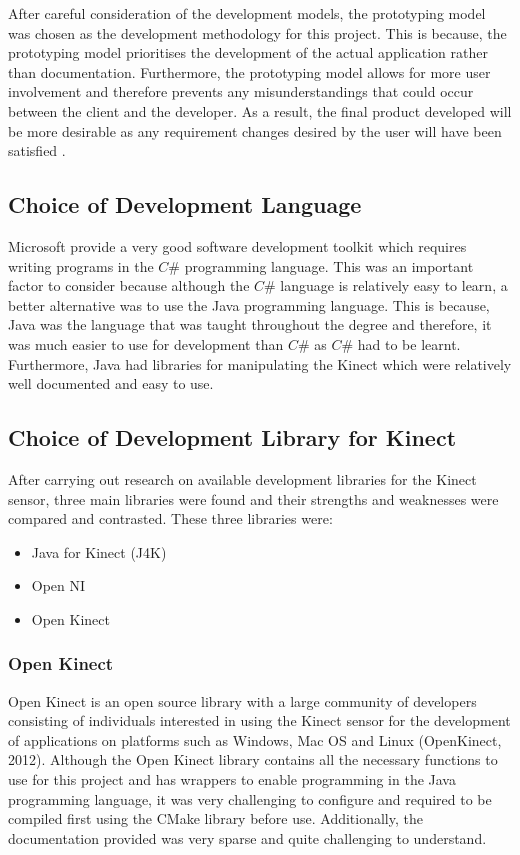 \documentclass[a4paper, 12pt]{article}
\begin{document}
\parskip 0.2in

After careful consideration of the development models, the prototyping model was chosen as the development methodology for this project. This is because, the prototyping model prioritises the development of the actual application rather than documentation. Furthermore, the prototyping model allows for more user involvement and therefore prevents any misunderstandings that could occur between the client and the developer. As a result, the final product developed will be more desirable as any requirement changes desired by the user will have been satisfied \citep{Sabale2012}.


\subsection{Choice of Development Language}
Microsoft provide a very good software development toolkit which requires writing programs in the $C\#$ programming language. This was an important factor to consider because although the $C\#$ language is relatively easy to learn, a better alternative was to use the Java programming language. This is because, Java was the language that was taught throughout the degree and therefore, it was much easier to use for development than $C\#$ as $C\#$ had to be learnt. Furthermore, Java had libraries for manipulating the Kinect which were relatively well documented and easy to use. 

\subsection{Choice of Development Library for Kinect}

After carrying out research on available development libraries for the Kinect sensor, three main libraries were found and their strengths and weaknesses were compared and contrasted. These three libraries were: 

\begin{itemize}
	\item Java for Kinect (J4K)
	\item Open NI
	\item Open Kinect
\end{itemize}

\subsubsection{Open Kinect}
Open Kinect is an open source library with a large community of developers consisting of individuals interested in using the Kinect sensor for the development of applications on platforms such as Windows, Mac OS and Linux (OpenKinect, 2012). Although the Open Kinect library contains all the necessary functions to use for this project and has wrappers to enable programming in the Java programming language, it was very challenging to configure and required to be compiled first using the CMake library before use. Additionally, the documentation provided was very sparse and quite challenging to understand. 
\end{document}
